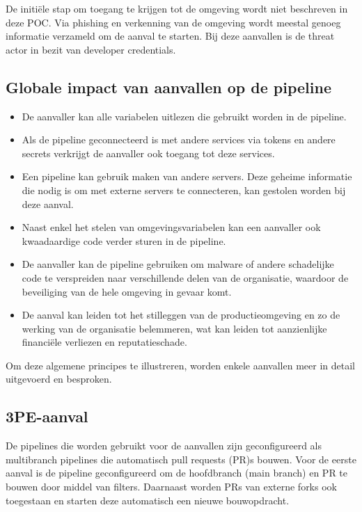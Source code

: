 De initiële stap om toegang te krijgen tot de omgeving wordt niet beschreven in deze POC. Via phishing en verkenning van de omgeving wordt meestal genoeg informatie verzameld om de aanval te starten. Bij deze aanvallen is de threat actor in bezit van developer credentials.
\clearpage

\subsection{
{Globale impact van aanvallen op de pipeline}}
\label{sec:Impact}
\begin{mdframed}
  \begin{itemize}
    \item De aanvaller kan alle variabelen uitlezen die gebruikt worden in de pipeline.
    \item Als de pipeline geconnecteerd is met andere services via tokens en andere secrets verkrijgt de aanvaller ook toegang tot deze services.
    \item Een pipeline kan gebruik maken van andere servers. Deze geheime informatie die nodig is om met externe servers te connecteren, kan gestolen worden bij deze aanval.
    \item Naast enkel het stelen van omgevingsvariabelen kan een aanvaller ook kwaadaardige code verder sturen in de pipeline.
    \item De aanvaller kan de pipeline gebruiken om malware of andere schadelijke code te verspreiden naar verschillende delen van de organisatie, waardoor de beveiliging van de hele omgeving in gevaar komt.
    \item De aanval kan leiden tot het stilleggen van de productieomgeving en zo de werking van de organisatie belemmeren, wat kan leiden tot aanzienlijke financiële verliezen en reputatieschade.
  \end{itemize}
\end{mdframed}

\vspace{0.5cm}
Om deze algemene principes te illustreren, worden enkele aanvallen meer in detail uitgevoerd en besproken.

\subsection{
{3PE-aanval}}
\label{sec:3PE}

De pipelines die worden gebruikt voor de aanvallen zijn geconfigureerd als multibranch pipelines die automatisch pull requests (PR)s bouwen. Voor de eerste aanval is de pipeline geconfigureerd om de hoofdbranch (main branch) en PR te bouwen door middel van filters. Daarnaast worden PRs van externe forks ook toegestaan en starten deze automatisch een nieuwe bouwopdracht.
\newline 

